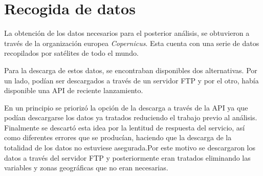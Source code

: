 
\begin{comment}
Este apartado pretende recoger los aspectos más interesantes del desarrollo del proyecto, comentados por los autores del mismo.
Debe incluir desde la exposición del ciclo de vida utilizado, hasta los detalles de mayor relevancia de las fases de análisis, diseño e implementación.
Se busca que no sea una mera operación de copiar y pegar diagramas y extractos del código fuente, sino que realmente se justifiquen los caminos de solución que se han tomado, especialmente aquellos que no sean triviales.
Puede ser el lugar más adecuado para documentar los aspectos más interesantes del diseño y de la implementación, con un mayor hincapié en aspectos tales como el tipo de arquitectura elegido, los índices de las tablas de la base de datos, normalización y desnormalización, distribución en ficheros3, reglas de negocio dentro de las bases de datos (EDVHV GH GDWRV DFWLYDV), aspectos de desarrollo relacionados con el WWW...
Este apartado, debe convertirse en el resumen de la experiencia práctica del proyecto, y por sí mismo justifica que la memoria se convierta en un documento útil, fuente de referencia para los autores, los tutores y futuros alumnos.
\end{comment}


\section{Recogida de datos}
La obtención de los datos necesarios para el posterior análisis, se obtuvieron a través de la organización europea \emph{Copernicus}. Esta cuenta con una serie de datos recopilados por satélites de todo el mundo.

Para la descarga de estos datos, se encontraban disponibles dos alternativas. Por un lado, podían ser descargados a través de un servidor FTP y por el otro, había disponible una API de reciente lanzamiento.

En un principio se priorizó la opción de la descarga a través de la API ya que podían descargarse los datos ya tratados reduciendo el trabajo previo al análisis. Finalmente se descartó esta idea por la lentitud de respuesta del servicio, así como diferentes errores que se producían, haciendo que la descarga de la totalidad de los datos no estuviese asegurada.Por este motivo se descargaron los datos a través del servidor FTP y posteriormente eran tratados eliminando las variables y zonas geográficas que no eran necesarias.

